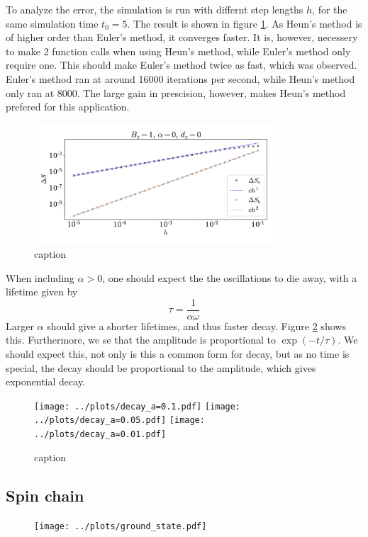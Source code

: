 \documentclass{article}
\begin{document}
    To analyze the error, the simulation is run with differnt step lengths $h$, for the same simulation time $t_0 = 5$. The result is shown in figure \ref{error}. As Heun's method is of higher order than Euler's method, it converges faster. It is, however, necessery to make 2 function calls when using Heun's method, while Euler's method only require one. This should make Euler's method twice as fast, which was observed. Euler's method ran at around 16000 iterations per second, while Heun's method only ran at 8000. The large gain in prescision, however, makes Heun's method prefered for this application. 

    \begin{figure}
        \centering
        \includegraphics[width=0.8\textwidth]{../plots/err.pdf}
        \caption{caption}
        \label{error}
    \end{figure}

    When including $\alpha > 0$, one should expect the the oscillations to die away, with a lifetime given by
    \begin{equation*}
        \tau = \frac{1}{\alpha \omega}
    \end{equation*}
    Larger $\alpha$ should give a shorter lifetimes, and thus faster decay. Figure \ref{decay} shows this. Furthermore, we se that the amplitude is proportional to $\exp(-t/\tau)$. We should expect this, not only is this a common form for decay, but as no time is special, the decay should be proportional to the amplitude, which gives exponential decay.

    \begin{figure}
        \centering
        \texttt{[image: ../plots/decay\_a=0.1.pdf]}
        \texttt{[image: ../plots/decay\_a=0.05.pdf]}
        \texttt{[image: ../plots/decay\_a=0.01.pdf]}
        \caption{caption}
        \label{decay}
    \end{figure}
    \subsection*{Spin chain}
    \begin{figure}
        \centering
        \texttt{[image: ../plots/ground\_state.pdf]}
    \end{figure}

    
    
\end{document}
